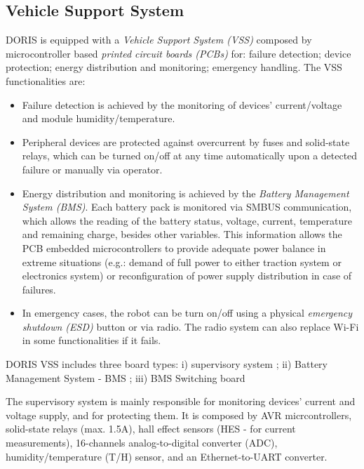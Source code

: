 \documentclass{ifacconf}
\begin{document}
\subsection{Vehicle Support System}\label{sec:VSS}

DORIS is equipped with a \emph{Vehicle Support System (VSS)} composed by microcontroller based \emph{printed circuit boards (PCBs)} for: failure detection; device protection; energy distribution and monitoring; emergency handling. The VSS functionalities are:

\begin{itemize}
    \item Failure detection is achieved by the monitoring of devices'
    current/voltage and module humidity/temperature.
    \item Peripheral devices are protected against overcurrent by fuses and
    solid-state relays, which can be turned on/off at any time automatically
    upon a detected failure or manually via operator.
    \item Energy distribution and monitoring is achieved by the \emph{Battery
    Management System (BMS)}. Each battery pack is monitored via SMBUS
    communication, which allows the reading of the battery status, voltage,
    current, temperature and remaining charge, besides other variables. This
    information allows the PCB embedded microcontrollers to provide adequate
    power balance in extreme situations (e.g.: demand of full power to either
    traction system or electronics system) or reconfiguration of power supply
    distribution in case of failures.
    \item In emergency cases, the robot can be turn on/off using a physical
    \emph{emergency shutdown (ESD)} button or via radio. The radio system can
    also replace Wi-Fi in some functionalities if it fails.
  \end{itemize}

DORIS VSS includes three board types: i) supervisory system
; ii) Battery Management System - BMS
; iii) BMS Switching board%

The supervisory system is mainly responsible for monitoring devices' current and voltage supply, and for protecting them. It is composed by AVR micrcontrollers, solid-state
relays (max. 1.5A), hall effect sensors (HES - for current measurements),
16-channels analog-to-digital converter (ADC), humidity/temperature (T/H)
sensor, and an Ethernet-to-UART converter.
\end{document}
